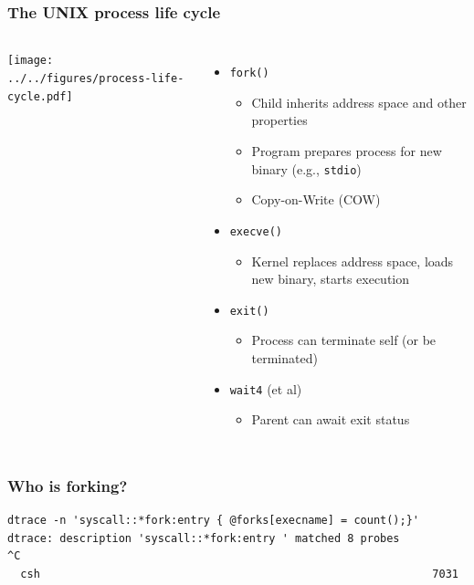\documentclass[pdftex]{beamer} %
\begin{document}
\begin{frame}
  \frametitle{The UNIX process life cycle}

  \begin{columns}[T]
      \vspace{0.5cm}
      \texttt{[image: ../../figures/process-life-cycle.pdf]}

    \begin{itemize}

      \pause

      \item \texttt{fork()}
      \begin{itemize}
	\item Child inherits address space and other properties
	\item Program prepares process for new binary (e.g., \texttt{stdio})
	\item Copy-on-Write (COW)
      \end{itemize}

      \pause

      \item \texttt{execve()}
      \begin{itemize}
	\item Kernel replaces address space, loads new binary, starts execution
      \end{itemize}

      \pause

      \item \texttt{exit()}
      \begin{itemize}
	\item Process can terminate self (or be terminated)
      \end{itemize}

      \pause

      \item \texttt{wait4} (et al)
      \begin{itemize}
	\item Parent can await exit status
      \end{itemize}
    \end{itemize}
  \end{columns}
\end{frame}

\begin{frame}[fragile]
  \frametitle{Who is forking?}
\begin{lstlisting}
dtrace -n 'syscall::*fork:entry { @forks[execname] = count();}'
dtrace: description 'syscall::*fork:entry ' matched 8 probes
^C
  csh                                                            7031
\end{lstlisting}
\end{frame}
\end{document}

